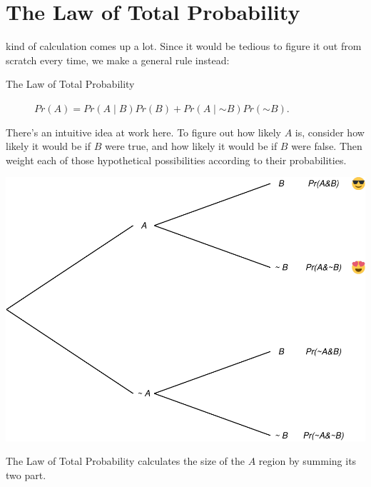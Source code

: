 \documentclass[justified]{tufte-book}
\newcommand{\given}{\mid}
\renewcommand{\neg}{\mathbin{\sim}}
\newcommand{\p}{Pr}
\theoremstyle{definition}
\theoremstyle{definition}
\theoremstyle{definition}
\theoremstyle{remark}
\begin{document}
\hypertarget{the-law-of-total-probability}{%
\section{The Law of Total
Probability}\label{the-law-of-total-probability}}

 kind of calculation comes up a lot. Since it would be
tedious to figure it out from scratch every time, we make a general rule
instead:

\begin{description}
\item[The Law of Total Probability]
\(\p(A) = \p(A \given B) \p(B) + \p(A \given \neg B) \p(\neg B)\).
\end{description}

There's an intuitive idea at work here. To figure out how likely \(A\)
is, consider how likely it would be if \(B\) were true, and how likely
it would be if \(B\) were false. Then weight each of those hypothetical
possibilities according to their probabilities.

\begin{marginfigure}
\includegraphics{_main_files/figure-latex/unnamed-chunk-74-1} \caption[The Law of Total Probability calculates the size of the $A$ region by summing its two part]{The Law of Total Probability calculates the size of the $A$ region by summing its two part.}\label{fig:unnamed-chunk-74}
\end{marginfigure}
\end{document}
